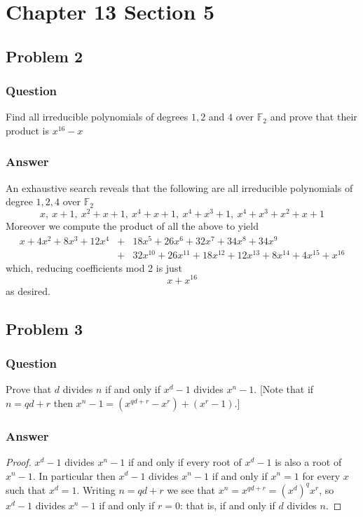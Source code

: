 \documentclass[10pt]{article}
\begin{document}
\section{Chapter 13 Section 5}
\subsection{Problem 2}
\subsubsection{Question}
Find all irreducible polynomials of degrees $1,2$ and $4$ over $\mathbb{F}_2$ and prove that their product is $x^{16}-x$
\subsubsection{Answer}
An exhaustive search reveals that the following are all irreducible polynomials of degree $1,2,4$ over $\mathbb{F}_2$
\[x,\  x+1,\  x^2 + x+ 1,\  x^4+x+1,\  x^4+x^3+1,\  x^4+x^3+x^2+x+1  \]
Moreover we compute the product of all the above to yield
\begin{eqnarray*}x+4 x^2+8 x^3+12 x^4&+&18 x^5+26 x^6+32 x^7+34 x^8+34 x^9\\&+&32 x^{10}+26 x^{11}+18 x^{12}+12 x^{13}+8 x^{14}+4 x^{15}+x^{16}\end{eqnarray*}
which, reducing coefficients mod 2 is just
\[x+x^{16}\]
as desired.
\subsection{Problem 3}
\subsubsection{Question}
Prove that $d$ divides $n$ if and only if $x^d-1$ divides $x^n-1$. [Note that if $n=q d +r$ then $x^n-1=(x^{qd+r}-x^r)+(x^r-1)$.]
\subsubsection{Answer}
\begin{proof}
$x^d-1$ divides $x^n-1$ if and only if every root of $x^d-1$ is also a root of $x^n-1$. In particular then $x^d-1$ divides $x^n-1$ if and only if $x^n=1$ for every $x$ such that $x^d=1$. Writing $n=qd+r$ we see that $x^n=x^{qd+r}={(x^d)}^q x^r$, so $x^d-1$ divides $x^n-1$ if and only if $r=0$: that is, if and only if $d$ divides $n$.
\end{proof}
\end{document}
